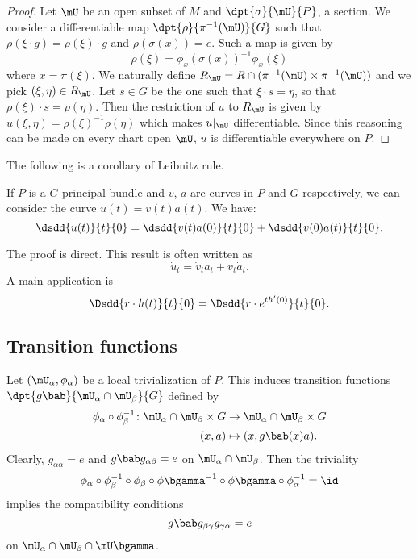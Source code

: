 \begin{proof}
Let $\mU$ be an open subset of $M$ and $\dpt{\sigma}{\mU}{P}$, a section. We consider a differentiable map $\dpt{\rho}{\pi^{-1}(\mU)}{G}$ such that $\rho(\xi\cdot g)=\rho(\xi)\cdot g$ and $\rho(\sigma(x))=e$. Such a map is given by
\[
   \rho(\xi)=\phi_x(\sigma(x))^{-1}\phi_x(\xi)
\]
where $x=\pi(\xi)$. We naturally define $R_{\mU}=R\cap( \pi^{-1}(\mU)\times\pi^{-1}(\mU) )$ and we pick $(\xi,\eta)\in R_{\mU}$. Let $s\in G$ be the one such that $\xi\cdot s=\eta$, so that $\rho(\xi)\cdot s=\rho(\eta)$. Then the restriction of $u$ to $R_{\mU}$ is given by $u(\xi,\eta)=\rho(\xi)^{-1}\rho(\eta)$ which makes $u|_{\mU}$ differentiable. Since this reasoning can be made on every chart open $\mU$, $u$ is differentiable everywhere on $P$.
\end{proof}

The following is a corollary of Leibnitz rule.
\begin{corollary}  \label{cor_PrincLeib}
If $P$ is a $G$-principal bundle and $v$, $a$ are curves in $P$ and $G$ respectively, we can consider the curve $u(t)=v(t)a(t)$. We have:
\[
         \dsdd{u(t)}{t}{0}=\dsdd{v(t)a(0)}{t}{0}+\dsdd{v(0)a(t)}{t}{0}.
\]
\end{corollary}
 The proof is direct. This result is often written as
\begin{equation}
               \dot{u}_t=\dot{v}_ta_t+v_t\dot{a}_t.
\end{equation}
A main application is 
\begin{equation}\label{eq:rdotht}
  \Dsdd{ r\cdot h(t) }{t}{0}=\Dsdd{r\cdot e^{th'(0)}}{t}{0}.
\end{equation}

\subsection{Transition functions}


Let $(\mU_{\alpha},\phi_{\alpha})$ be a local trivialization of $P$. This induces transition functions $\dpt{g\bab}{\mU_{\alpha}\cap\mU_{\beta}}{G}$ defined by
\begin{equation}
	\begin{aligned}
		\phi_{\alpha}\circ\phi_{\beta}^{-1}\colon \mU_{\alpha}\cap\mU_{\beta}\times G&\to \mU_{\alpha}\cap\mU_{\beta}\times G \\
		(x,a)&\mapsto (x,g\bab(x)a).\label{eq:transi_princ} 
	\end{aligned}
\end{equation}
Clearly, $g_{\alpha\alpha}=e$ and $g\bab g_{\alpha\beta}=e$ on $\mU_{\alpha}\cap\mU_{\beta}$. Then the triviality
\[
  \phi_{\alpha}\circ\phi_{\beta}^{-1}\circ\phi_{\beta}\circ\phi\bgamma^{-1}\circ\phi\bgamma\circ\phi_{\alpha}^{-1}=\id
\]
implies the compatibility conditions
\begin{equation}
g\bab g_{\beta\gamma} g_{\gamma\alpha}=e
\end{equation}
on $\mU_{\alpha}\cap\mU_{\beta}\cap\mU\bgamma$.

